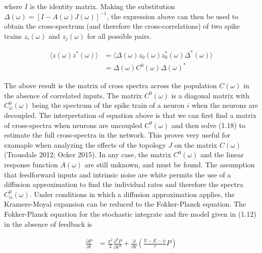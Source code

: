 \documentclass{ucetd}
\begin{document}
where $I$ is the identity matrix. Making the substitution $\Delta(\omega) = \left[I-A(\omega)J(\omega)\right]^{-1}$, the expression above can then be used to obtain the cross-spectrum (and therefore the cross-correlations) of two spike trains $z_{i}(\omega)$ and $z_{j}(\omega)$ for all possible pairs. 

\begin{align}
\langle z(\omega)z^{*}(\omega)\rangle &= \langle \Delta(\omega)z_{0}(\omega)z_{0}^{*}(\omega)\Delta^{*}(\omega)\rangle\\
&= \Delta(\omega)C^{0}(\omega)\Delta(\omega)^{*}
\end{align}

The above result is the matrix of cross spectra across the population $C(\omega)$ in the absence of correlated inputs. The matrix $C^{0}(\omega)$ is a diagonal matrix with $C_{ii}^{0}(\omega)$ being the spectrum of the spike train of a neuron $i$ when the neurons are decoupled. The interpretation of equation above is that we can first find a matrix of cross-spectra when neurons are uncoupled $C^{0}(\omega)$ and then solve (1.18) to estimate the full cross-spectra in the network. This proves very useful for examaple when analyzing the effects of the topology $J$ on the matrix $C(\omega)$ (Trousdale 2012; Ocker 2015). In any case, the matrix $C^{0}(\omega)$ and the linear response function $A(\omega)$ are still unknown, and must be found. The assumption that feedforward inputs and intrinsic noise are white permits the use of a diffusion approximation to find the individual rates and therefore the spectra $C_{ii}^{0}(\omega)$. Under conditions in which a diffusion approximation applies, the Kramers-Moyal expansion can be reduced to the Fokker-Planck equation. The Fokker-Planck equation for the stochastic integrate and fire model given in (1.12) in the absence of feedback is

\begin{align}
\frac{\partial P}{\partial t} &= \frac{\sigma^{2}}{2}\frac{\partial^{2}P}{\partial V^{2}} + \frac{\partial}{\partial V}\left(\frac{V-E-\psi}{\tau}P\right)
\end{align}
\end{document}
